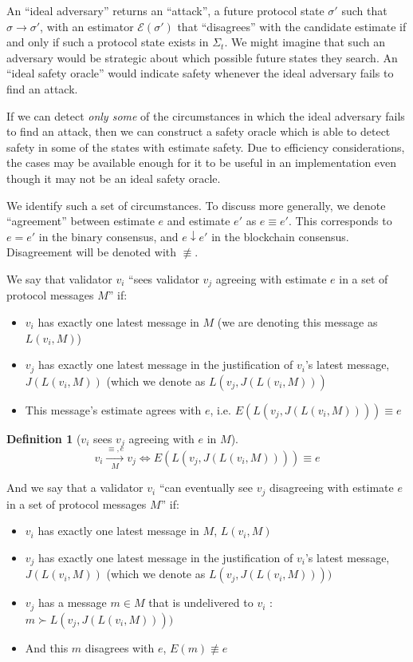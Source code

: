 \documentclass{article}
\theoremstyle{definition}
\newtheorem{defn}{Definition}[section]
\begin{document}
An ``ideal adversary'' returns an ``attack'', a future protocol state $\sigma'$ such that $\sigma \to \sigma'$, with an estimator $\mathcal{E}(\sigma')$ that ``disagrees'' with the candidate estimate if and only if such a protocol state exists in $\Sigma_t$. We might imagine that such an adversary would be strategic about which possible future states they search. An ``ideal safety oracle'' would indicate safety whenever the ideal adversary fails to find an attack.

If we can detect \emph{only some} of the circumstances in which the ideal adversary fails to find an attack, then we can construct a safety oracle which is able to detect safety in some of the states with estimate safety. Due to efficiency considerations, the cases may be available enough for it to be useful in an implementation even though it may not be an ideal safety oracle.

We identify such a set of circumstances. To discuss more generally, we denote ``agreement'' between estimate $e$ and estimate $e'$ as $e \equiv e'$. This corresponds to $e = e'$ in the binary consensus, and $e \downarrow e'$ in the blockchain consensus. Disagreement will be denoted with $\not\equiv$.

We say that validator $v_i$ ``sees validator $v_j$ agreeing with estimate $e$ in a set of protocol messages $M$'' if:
\begin{itemize}
\item $v_i$ has exactly one latest message in $M$ (we are denoting this message as $L(v_i, M)$)
\item $v_j$ has exactly one latest message in the justification of $v_i$'s latest message, $J(L(v_i, M))$ (which we denote as $L(v_j, J(L(v_i, M)))$
\item This message's estimate agrees with $e$, i.e. $E(L(v_j, J(L(v_i, M)))) \equiv e$
\end{itemize}

\begin{defn}[$v_i$ sees $v_j$ agreeing with $e$ in $M$]
$$
v_i \xrightarrow[\text{$M$}]{\text{$\equiv, e$}} v_j \iff E(L(v_j, J(L(v_i, M)))) \equiv e
$$
\end{defn}

And we say that a validator $v_i$ ``can eventually see $v_j$ disagreeing with estimate $e$ in a set of protocol messages $M$'' if:
\begin{itemize}
\item $v_i$ has exactly one latest message in $M$, $L(v_i, M)$
\item $v_j$ has exactly one latest message in the justification of $v_i$'s latest message, $J(L(v_i, M))$ (which we denote as $L(v_j, J(L(v_i, M))))$
\item $v_j$ has a message $m \in M$ that is undelivered to $v_i$ : $m \succ L(v_j, J(L(v_i, M))))$
\item And this $m$ disagrees with $e$, $E(m) \not\equiv e$
\end{itemize}
\end{document}
